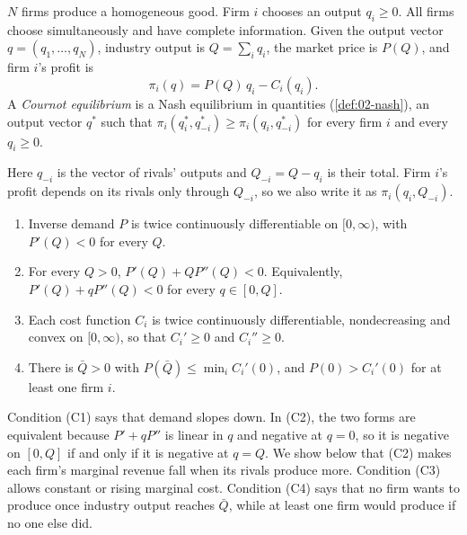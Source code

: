 \begin{definition}\label{def:02-cournot}
$N$ firms produce a homogeneous good. Firm $i$ chooses an output $q_i \ge 0$. All firms choose simultaneously and
have complete information. Given the output vector $q = (q_1, \dots, q_N)$, industry output is $Q = \sum_i q_i$,
the market price is $P(Q)$, and firm $i$'s profit is
\[
  \pi_i(q) = P(Q)\,q_i - C_i(q_i) .
\]
A \emph{Cournot equilibrium} is a Nash equilibrium in quantities (\cref{def:02-nash}), an output vector $q^*$ such that
$\pi_i(q_i^*, q_{-i}^*) \ge \pi_i(q_i, q_{-i}^*)$ for every firm $i$ and every $q_i \ge 0$.
\end{definition}

Here $q_{-i}$ is the vector of rivals' outputs and $Q_{-i} = Q - q_i$ is their total. Firm $i$'s profit depends on
its rivals only through $Q_{-i}$, so we also write it as $\pi_i(q_i, Q_{-i})$.

\begin{assumption}\label{ass:02-cournot}
\leavevmode
\begin{enumerate}[label=(C\arabic*)]
  \item Inverse demand $P$ is twice continuously differentiable on $[0, \infty)$, with $P'(Q) < 0$ for every $Q$.
  \item For every $Q > 0$, $P'(Q) + QP''(Q) < 0$. Equivalently, $P'(Q) + qP''(Q) < 0$ for every $q \in [0, Q]$.
  \item Each cost function $C_i$ is twice continuously differentiable, nondecreasing and convex on $[0, \infty)$,
  so that $C_i' \ge 0$ and $C_i'' \ge 0$.
  \item There is $\bar Q > 0$ with $P(\bar Q) \le \min_i C_i'(0)$, and $P(0) > C_i'(0)$ for at least one firm $i$.
\end{enumerate}
\end{assumption}

Condition (C1) says that demand slopes down. In (C2), the two forms are equivalent because $P' + qP''$ is linear in
$q$ and negative at $q = 0$, so it is negative on $[0, Q]$ if and only if it is negative at $q = Q$. We show below
that (C2) makes each firm's marginal revenue fall when its rivals produce more. Condition (C3) allows constant or
rising marginal cost. Condition (C4) says that no firm wants to produce once industry output reaches $\bar Q$,
while at least one firm would produce if no one else did.

